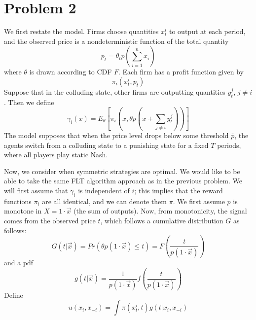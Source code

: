 \documentclass[10pt,letter]{article}
\begin{document}
\section*{Problem 2}
We first restate the model. Firms choose quantities $x^i_t$ to output at each period, and the observed price is a nondeterministic function of the total quantity
\[ p_t = \theta_t p\left( \sum_{i=1}^n x_i \right) \]
where $\theta$ is drawn according to CDF $F$. Each firm has a profit function given by
\[ \pi_i(x^i_t, p_t ) \]
Suppose that in the colluding state, other firms are outputting quantities $y_t^j$, $j \neq i$. Then we define
\[ \gamma_i(x) = E_{\theta} \left[ \pi_i\left(x, \theta p\left(x + \sum_{j \neq i}y_t^j\right)\right) \right] \]
The model supposes that when the price level drops below some threshold $\bar{p}$, the agents switch from a colluding state to a punishing state for a fixed $T$ periods, where all players play static Nash.


Now, we consider when symmetric strategies are optimal. We would like to be able to take the same FLT algorithm approach as in the previous problem. We will first assume that $\gamma_i$ is independent of $i$; this implies that the reward functions $\pi_i$ are all identical, and we can denote them $\pi$. We first assume $p$ is monotone in $X = 1 \cdot \vec{x}$ (the sum of outputs). Now, from monotonicity, the signal comes from the observed price $t$, which follows a cumulative distribution $G$ as follows:
\[ G( t | \vec{x} ) = Pr( \theta p(1 \cdot \vec{x}) \le t) = F\left( \frac{t}{p(1 \cdot \vec{x})} \right) \]
and a pdf
\[ g(t | \vec{x}) = \frac{1}{p(1 \cdot \vec{x})} f\left( \frac{t}{p(1 \cdot \vec{x})} \right) \]
Define
\[ u(x_i, x_{-i}) = \int \pi (x^i_t, t) g(t | x_i, x_{-i} ) \]
\end{document}
